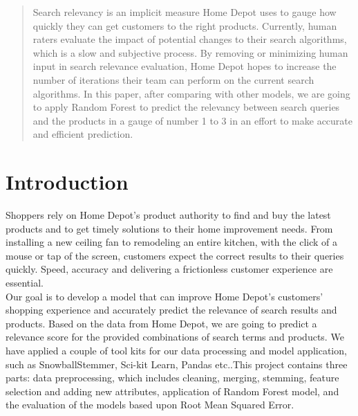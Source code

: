 \documentclass{sig-alternate-05-2015}
\begin{document}
\maketitle
\begin{abstract}

Search relevancy is an implicit measure Home Depot uses to gauge how quickly they can get customers to the right products. Currently, human raters evaluate the impact of potential changes to their search algorithms, which is a slow and subjective process. By removing or minimizing human input in search relevance evaluation, Home Depot hopes to increase the number of iterations their team can perform on the current search algorithms. In this paper, after comparing with other models, we are going to apply Random Forest to predict the relevancy between search queries and the products in a gauge of number 1 to 3 in an effort to make accurate and efficient prediction. 
\end{abstract}

%
%

%
%
\printccsdesc



\section{Introduction}
Shoppers rely on Home Depot's product authority to find and buy the latest products and to get timely solutions to their home improvement needs. From installing a new ceiling fan to remodeling an entire kitchen, with the click of a mouse or tap of the screen, customers expect the correct results to their queries quickly. Speed, accuracy and delivering a frictionless customer experience are essential.\\

Our goal is to develop a model that can improve Home Depot's customers' shopping experience and accurately predict the relevance of search results and products. Based on the data from Home Depot, we are going to predict a relevance score for the provided combinations of search terms and products. We have applied a couple of tool kits for our data processing and model application, such as SnowballStemmer, Sci-kit Learn, Pandas etc..This project contains three parts: data preprocessing, which includes cleaning, merging, stemming, feature selection and adding new attributes, application of Random Forest model, and the evaluation of  the models based upon Root Mean Squared Error. \\
\end{document}
